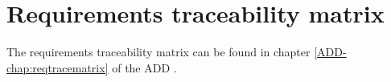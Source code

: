 \chapter{Requirements traceability matrix}
\label{chap:matrix}

The requirements traceability matrix can be found in chapter \ref{ADD-chap:reqtracematrix} of the ADD \cite{add}.